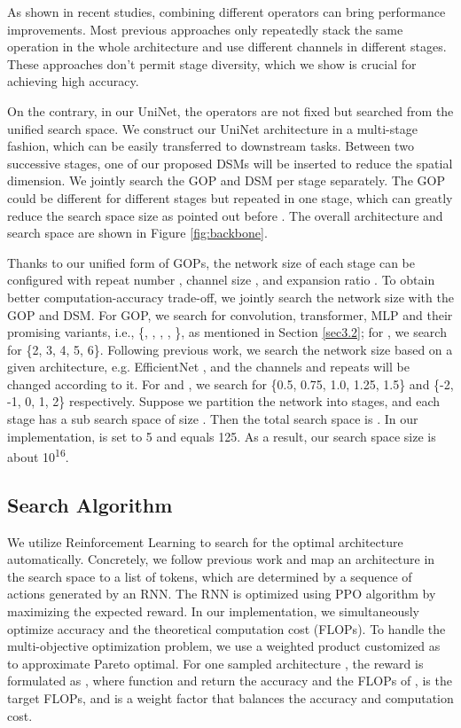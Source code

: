 \documentclass{article} \usepackage{iclr2022_conference,times}
\begin{document}
As shown in recent studies, combining different operators \citep{cvt, yuan2021incorporating} can bring performance improvements. Most previous approaches only repeatedly stack the same operation in the whole architecture and use different channels in different stages. These approaches don't permit stage diversity, which we show is crucial for achieving high accuracy.

On the contrary, in our UniNet, the operators are not fixed but searched from the unified search space. We construct our UniNet architecture in a multi-stage fashion, which can be easily transferred to downstream tasks. Between two successive stages, one of our proposed DSMs will be inserted to reduce the spatial dimension. We jointly search the GOP and DSM per stage separately. The GOP could be different for different stages but repeated in one stage, which can greatly reduce the search space size as pointed out before \citep{mnas}. The overall architecture and search space are shown in Figure \ref{fig:backbone}. 

Thanks to our unified form of GOPs, the network size of each stage can be configured with repeat number , channel size , and expansion ratio . To obtain better computation-accuracy trade-off, we jointly search the network size with the GOP and DSM. For GOP, we search for convolution, transformer, MLP and their promising variants, i.e., \{, , , , \}, as mentioned in Section \ref{sec3.2}; for , we search for \{2, 3, 4, 5, 6\}. 
Following previous work, we search the network size based on a given architecture, e.g. EfficientNet \citep{efficientnet}, and the channels and repeats will be changed according to it. For  and , we search for \{0.5, 0.75, 1.0, 1.25, 1.5\} and \{-2, -1, 0, 1, 2\} respectively.
Suppose we partition the network into  stages, and each stage has a sub search space of size . Then the total search space is . In our implementation,  is set to 5 and  equals 125. As a result, our search space size is about 10\textsuperscript{16}.

\subsection{Search Algorithm}

We utilize Reinforcement Learning to search for the optimal architecture automatically. Concretely, we follow previous work \citep{fnas} and map an architecture in the search space to a list of tokens, which are determined by a sequence of actions generated by an RNN. The RNN is optimized using PPO algorithm \citep{ppo} by maximizing the expected reward. In our implementation, we simultaneously optimize accuracy and the theoretical computation cost (FLOPs). To handle the multi-objective optimization problem, we use a weighted product customized as \citet{mnas} to approximate Pareto optimal. For one sampled architecture , the reward is formulated as , where function  and  return the accuracy and the FLOPs of ,  is the target FLOPs, and  is a weight factor that balances the accuracy and computation cost.
\end{document}
